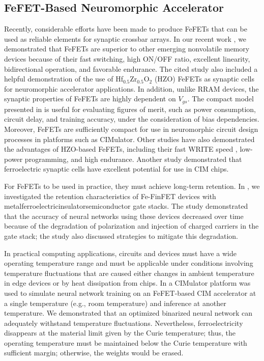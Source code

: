 \documentclass[journal]{IEEEtran}
\begin{document}
\subsection{FeFET-Based Neuromorphic Accelerator}
Recently, considerable efforts have been made to produce FeFETs that can be used as reliable elements for synaptic crossbar arrays. In our recent work \cite{FinFET_De, FeFET_Lu}, we demonstrated that FeFETs are superior to other emerging nonvolatile memory devices because of their fast switching, high ON/OFF ratio, excellent linearity, bidirectional operation, and favorable endurance. The cited study also included a helpful demonstration of the use of Hf$_{0.5}$Zr$_{0.5}$O$_2$ (HZO) FeFETs as synaptic cells for neuromorphic accelerator applications. In addition, unlike RRAM devices, the synaptic properties of FeFETs are highly dependent on $V_{gs}$. The compact model presented in \cite{FeFET_Lu} is useful for evaluating figures of merit, such as power consumption, circuit delay, and training accuracy, under the consideration of bias dependencies. Moreover, FeFETs are sufficiently compact for use in neuromorphic circuit design processes in platforms such as CIMulator. Other studies have also demonstrated the advantages of HZO-based FeFETs, including their fast WRITE speed \cite{FeFET_fast}, low-power programming, and high endurance. Another study \cite{FeFET_high_endurance} demonstrated that ferroelectric synaptic cells have excellent potential for use in CIM chips. 


For FeFETs to be used in practice, they must achieve long-term retention. In \cite{Fe-FinFET}, we investigated the retention characteristics of Fe-FinFET devices with metal\textendash ferroelectric\textendash insulator\textendash semiconductor gate stacks. The study demonstrated that the accuracy of neural networks using these devices decreased over time because of the degradation of polarization and injection of charged carriers in the gate stack; the study also discussed strategies to mitigate this degradation.


In practical computing applications, circuits and devices must have a wide operating temperature range and must be applicable under conditions involving   temperature fluctuations that are caused either changes in ambient temperature in edge devices or by heat dissipation from chips. In \cite{FeFET_in_BNN} a CIMulator platform was used to simulate neural network training on an FeFET-based CIM accelerator at a single temperature (e.g., room temperature) and inference at another temperature. We demonstrated that an optimized binarized neural network can adequately withstand temperature fluctuations. Nevertheless, ferroelectricity disappears at the material limit given by the Curie temperature; thus, the operating temperature must be maintained below the Curie temperature with sufficient margin; otherwise, the weights would be erased.
\end{document}
